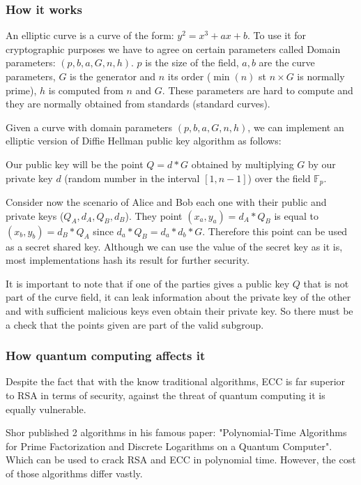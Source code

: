 \subsubsection{How it works}

An elliptic curve is a curve of the form: $y^2 = x^3 + ax + b$. To use it for
cryptographic purposes we have to agree on certain parameters called Domain
parameters: $(p,b,a,G,n,h)$. $p$ is the size of the field, $a,b$ are the curve
parameters, $G$ is the generator and $n$ its order ($\min(n)$ st $ n \times G$
is normally prime), $h$ is computed from $n$ and $G$. These parameters are hard
to compute and they are normally obtained from standards (standard curves).

Given a curve with domain parameters $(p,b,a,G,n,h)$, we can implement an
elliptic version of Diffie Hellman public key algorithm as follows:

Our public key will be the point $Q = d * G$ obtained by multiplying $G$ by our
private key $d$ (random number in the interval $[1, n-1]$) over the field
$\mathds{F}_p$.

Consider now the scenario of Alice and Bob each one with their public and
private keys ($Q_A, d_A, Q_B, d_B$). They point $(x_a, y_a) = d_A * Q_B$ is
equal to $(x_b, y_b) = d_B * Q_A$ since $d_a * Q_B = d_a * d_b * G$. Therefore
this point can be used as a secret shared key. Although we can use the value of
the secret key as it is, most implementations hash its result for further
security.

It is important to note that if one of the parties gives a public key $Q$ that
is not part of the curve field, it can leak information about the private key of
the other and with sufficient malicious keys even obtain their private key. So
there must be a check that the points given are part of the valid subgroup.
\cite{pernul_practical_2015}


\subsubsection{How quantum computing affects it}

Despite the fact that with the know traditional algorithms, ECC is far superior
to RSA in terms of security, against the threat of quantum computing it is
equally vulnerable.

Shor published 2 algorithms in his famous paper: "Polynomial-Time Algorithms for
Prime Factorization and Discrete Logarithms on a Quantum Computer".
\cite{shor_polynomial-time_1997} Which can be
used to crack RSA and ECC in polynomial time. However, the cost of those
algorithms differ vastly.

